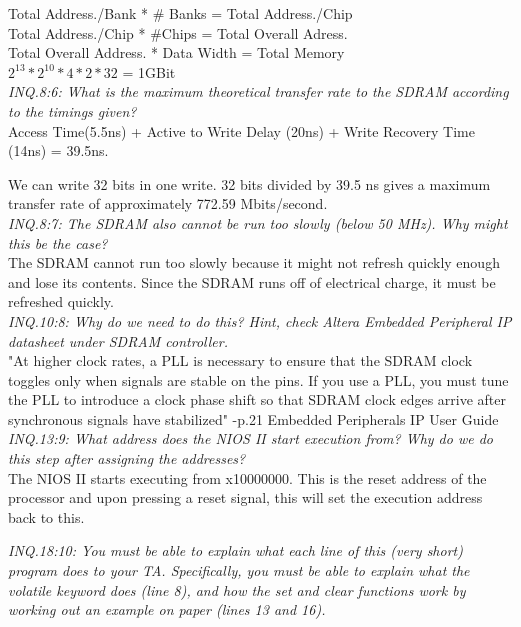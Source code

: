 \documentclass[journal, twocolumn, final,11pt,letterpaper]{IEEEtran}
\begin{document}
Total Address./Bank * \# Banks = Total Address./Chip \\

Total Address./Chip * \#Chips = Total Overall Adress. \\

Total Overall Address. * Data Width = Total Memory \\

$2^{13} * 2^{10} * 4 * 2 * 32 $ = 1GBit \\

\textit{INQ.8:6: What is the maximum theoretical transfer rate to the SDRAM according to the timings given?} \\

Access Time(5.5ns) + Active to Write Delay (20ns) + Write Recovery Time (14ns) = 39.5ns.

We can write 32 bits in one write. 32 bits divided by 39.5 ns gives a maximum transfer rate of approximately 772.59 Mbits/second. \\ 


\textit{INQ.8:7: The SDRAM also cannot be run too slowly (below 50 MHz).  Why might this be the case?} \\

The SDRAM cannot run too slowly because it might not refresh quickly enough and lose its contents. Since the SDRAM runs off of electrical charge, it must be refreshed quickly. \\

\textit{INQ.10:8: Why do we need to do this? Hint, check Altera Embedded Peripheral IP datasheet under SDRAM controller.} \\

 "At higher clock rates, a PLL is necessary to ensure that the SDRAM clock toggles only when signals are stable on the pins. If you use a PLL, you must tune the PLL to introduce a clock phase shift so that SDRAM clock edges
 arrive after synchronous signals have stabilized" -p.21 Embedded Peripherals IP User Guide \\


\textit{INQ.13:9: What address does the NIOS II start execution from? Why do we do this step after assigning the addresses?}  \\

The NIOS II starts executing from x10000000. This is the reset address of the processor and upon pressing a reset signal, this will set the execution address back to this.



\textit{INQ.18:10: You must be able to explain what each line of this (very short) program does to your TA. Specifically, you must be able to explain what the volatile keyword does (line 8), and how the set and clear functions work by working out an example on paper (lines 13 and 16).} \\
\end{document}
